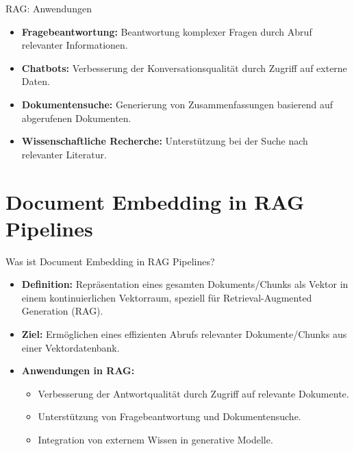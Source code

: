\documentclass[aspectratio=1610, xcolor=dvipsnames, 9pt]{beamer}
\begin{document}
\begin{frame}{RAG: Anwendungen}
  \begin{itemize}
    \item \textbf{Fragebeantwortung:} Beantwortung komplexer Fragen durch Abruf relevanter Informationen. \\
    \item \textbf{Chatbots:} Verbesserung der Konversationsqualität durch Zugriff auf externe Daten. \\
    \item \textbf{Dokumentensuche:} Generierung von Zusammenfassungen basierend auf abgerufenen Dokumenten. \\
    \item \textbf{Wissenschaftliche Recherche:} Unterstützung bei der Suche nach relevanter Literatur.
  \end{itemize}
\end{frame}

\section{Document Embedding in RAG Pipelines}

\begin{frame}{Was ist Document Embedding in RAG Pipelines?}
  \begin{itemize}
    \item \textbf{Definition:} Repräsentation eines gesamten Dokuments/Chunks als Vektor in einem kontinuierlichen Vektorraum, speziell für Retrieval-Augmented Generation (RAG).
    \item \textbf{Ziel:} Ermöglichen eines effizienten Abrufs relevanter Dokumente/Chunks aus einer Vektordatenbank.
    \item \textbf{Anwendungen in RAG:}
      \begin{itemize}
        \item Verbesserung der Antwortqualität durch Zugriff auf relevante Dokumente.
        \item Unterstützung von Fragebeantwortung und Dokumentensuche.
        \item Integration von externem Wissen in generative Modelle.
      \end{itemize}
  \end{itemize}
\end{frame}
\end{document}
